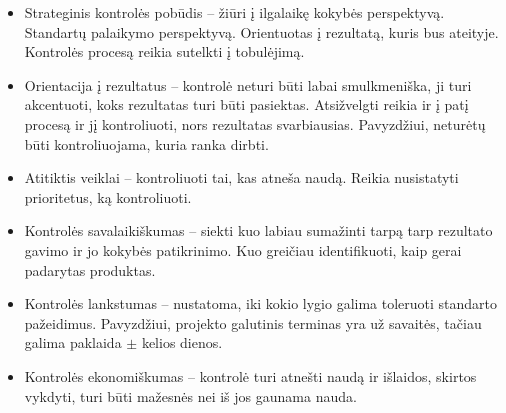 \begin{itemize}
  \item Strateginis kontrolės pobūdis – žiūri į ilgalaikę
    kokybės perspektyvą. Standartų palaikymo perspektyvą. Orientuotas
    į rezultatą, kuris bus ateityje. Kontrolės procesą reikia
    sutelkti į tobulėjimą.
  \item Orientacija į rezultatus – kontrolė neturi būti labai
    smulkmeniška, ji turi akcentuoti, koks rezultatas turi būti pasiektas.
    Atsižvelgti reikia ir į patį procesą ir jį kontroliuoti, nors
    rezultatas svarbiausias. Pavyzdžiui, neturėtų būti
    kontroliuojama, kuria ranka dirbti.
  \item Atitiktis veiklai – kontroliuoti tai, kas atneša naudą.
    Reikia nusistatyti prioritetus, ką kontroliuoti.
  \item Kontrolės savalaikiškumas – siekti kuo labiau sumažinti tarpą
    tarp rezultato gavimo ir jo kokybės patikrinimo. Kuo greičiau
    identifikuoti, kaip gerai padarytas produktas.
  \item Kontrolės lankstumas – nustatoma, iki kokio lygio galima toleruoti
    standarto pažeidimus. Pavyzdžiui, projekto galutinis terminas yra už
    savaitės, tačiau galima paklaida $\pm$ kelios dienos.
  \item Kontrolės ekonomiškumas – kontrolė turi atnešti naudą ir
    išlaidos, skirtos vykdyti, turi būti mažesnės nei iš jos gaunama
    nauda.
\end{itemize}
